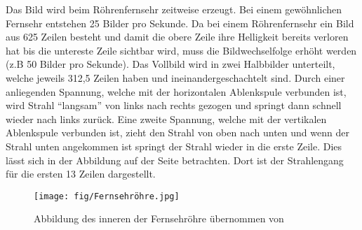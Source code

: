 Das Bild wird beim Röhrenfernsehr zeitweise erzeugt.
Bei einem gewöhnlichen Fernsehr entstehen 25 Bilder pro Sekunde.
Da bei einem Röhrenfernsehr ein Bild aus 625 Zeilen besteht und damit die obere Zeile ihre Helligkeit bereits verloren hat bis die untereste Zeile sichtbar wird, muss die Bildwechselfolge erhöht werden (z.B 50 Bilder pro Sekunde).
Das Vollbild wird in zwei Halbbilder unterteilt, welche jeweils 312,5 Zeilen haben und ineinandergeschachtelt sind.
Durch einer anliegenden Spannung, welche mit der horizontalen Ablenkspule verbunden ist, wird Strahl "`langsam"' von links nach rechts gezogen und springt dann schnell wieder nach links zurück.
Eine zweite Spannung, welche mit der vertikalen Ablenkspule verbunden ist, zieht den Strahl von oben nach unten und wenn der Strahl unten angekommen ist springt der Strahl wieder in die erste Zeile.
Dies lässt sich in der Abbildung auf der Seite \cite{Roehrenfernsehr} betrachten.
Dort ist der Strahlengang für die ersten 13 Zeilen dargestellt.
\begin{figure}
    \centering
    \texttt{[image: fig/Fernsehröhre.jpg]}
    \caption{Abbildung des inneren der Fernsehröhre übernommen von \cite{Abbildung} }
    \label{fig:Fernsehroehre}
\end{figure}
